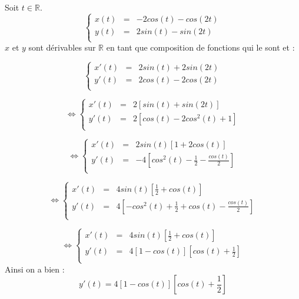 Soit $t \in \mathbb{R}$.\\
\[
  \left\{
  \begin{array}{rcl}
    x(t) & = & -2cos(t)-cos(2t) \\
    y(t) & = & 2sin(t)-sin(2t)  \\
  \end{array}
  \right.
\]
$x$ et $y$ sont dérivables sur $\mathbb{R}$ en tant que composition de fonctions qui le sont et :

\[
  \left\{
  \begin{array}{rcl}
    x'(t) & = & 2sin(t)+2sin(2t) \\
    y'(t) & = & 2cos(t)-2cos(2t) \\
  \end{array}
  \right.
\]

\[
  \iff
  \left\{
  \begin{array}{rcl}
    x'(t) & = & 2\left[sin(t)+sin(2t)\right]     \\
    y'(t) & = & 2\left[cos(t)-2cos^2(t)+1\right] \\
  \end{array}
  \right.
\]

\[
  \iff
  \left\{
  \begin{array}{rcl}
    x'(t) & = & 2sin(t)\left[1+2cos(t)\right]                        \\
    y'(t) & = & -4\left[cos^2(t)-\frac{1}{2}-\frac{cos(t)}{2}\right] \\
  \end{array}
  \right.
\]

\[
  \iff
  \left\{
  \begin{array}{rcl}
    x'(t) & = & 4sin(t)\left[\frac{1}{2}+cos(t)\right]                      \\
    y'(t) & = & 4\left[-cos^2(t)+\frac{1}{2}+cos(t)-\frac{cos(t)}{2}\right] \\
  \end{array}
  \right.
\]

\[
  \iff
  \left\{
  \begin{array}{rcl}
    x'(t) & = & 4sin(t)\left[\frac{1}{2}+cos(t)\right]                \\
    y'(t) & = & 4\left[1-cos(t)\right]\left[cos(t)+\frac{1}{2}\right] \\
  \end{array}
  \right.
\]
Ainsi on a bien :
\[y'(t) = 4\left[1-cos(t)\right]\left[cos(t)+\frac{1}{2}\right]\]

